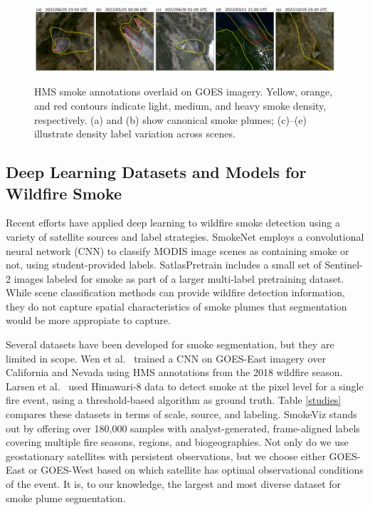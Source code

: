 \documentclass{article}
\begin{document}
\begin{figure}[!htb]
    \centering
    \includegraphics[width=\linewidth]{figures/variations_small.png}\label{densities}
    \caption{HMS smoke annotations overlaid on GOES imagery. Yellow, orange, and red contours indicate light, medium, and heavy smoke density, respectively. (a) and (b) show canonical smoke plumes; (c)–(e) illustrate density label variation across scenes.}
\end{figure}

\subsection{Deep Learning Datasets and Models for Wildfire Smoke}

Recent efforts have applied deep learning to wildfire smoke detection using a variety of satellite sources and label strategies. SmokeNet \cite{smokenet} employs a convolutional neural network (CNN) to classify MODIS image scenes as containing smoke or not, using student-provided labels. SatlasPretrain \cite{satlas} includes a small set of Sentinel-2 images labeled for smoke as part of a larger multi-label pretraining dataset. While scene classification methods can provide wildfire detection information, they do not capture spatial characteristics of smoke plumes that segmentation would be more appropiate to capture.

Several datasets have been developed for smoke segmentation, but they are limited in scope. Wen et al.\ \cite{smoke_goes} trained a CNN on GOES-East imagery over California and Nevada using HMS annotations from the 2018 wildfire season. Larsen et al.\ \cite{larsen} used Himawari-8 data to detect smoke at the pixel level for a single fire event, using a threshold-based algorithm as ground truth. Table \ref{studies} compares these datasets in terms of scale, source, and labeling. SmokeViz stands out by offering over 180,000 samples with analyst-generated, frame-aligned labels covering multiple fire seasons, regions, and biogeographies. Not only do we use geostationary satellites with persistent observations, but we choose either GOES-East or GOES-West based on which satellite has optimal observational conditions of the event. It is, to our knowledge, the largest and most diverse dataset for smoke plume segmentation.
\end{document}
